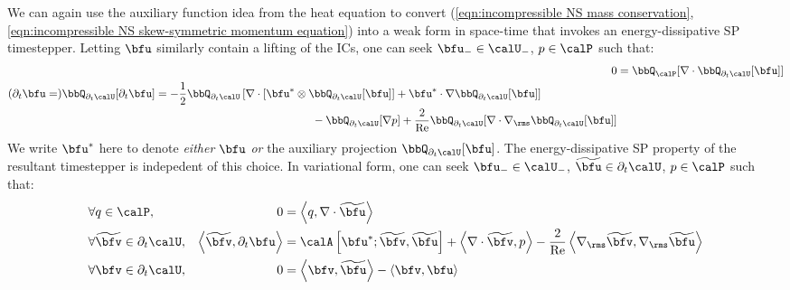     \begin{remark}
    \end{remark}

    We can again use the auxiliary function idea from the heat equation to convert (\ref{eqn:incompressible NS mass conservation}, \ref{eqn:incompressible NS skew-symmetric momentum equation}) into a weak form in space-time that invokes an energy-dissipative SP timestepper. Letting $\bfu$ similarly contain a lifting of the ICs, one can seek $\bfu_{-} \in \calU_{-}$, $p \in \calP$ such that:
    \begin{align}
                                                                            0  &=  \bbQ_{\calP}[\nabla\cdot\bbQ_{\partial_{t}\calU}[\bfu]]  \label{eqn:incompressible NS weak form 1}  \\
        \begin{split}
            (\partial_{t}\bfu  =)  \bbQ_{\partial_{t}\calU}[\partial_{t}\bfu]  &=  - \frac{1}{2}\bbQ_{\partial_{t}\calU}\left[\nabla\cdot\left[\bfu^{*}\otimes\bbQ_{\partial_{t}\calU}[\bfu]\right] + \bfu^{*}\cdot\nabla\bbQ_{\partial_{t}\calU}[\bfu]\right]  \\
                                                                               &\qquad\qquad\qquad\qquad\qquad\qquad\qquad- \bbQ_{\partial_{t}\calU}[\nabla p] + \frac{2}{\rmRe}\bbQ_{\partial_{t}\calU}[\nabla\cdot\nabla_{\rms}\bbQ_{\partial_{t}\calU}[\bfu]]
        \end{split}  \label{eqn:incompressible NS weak form 2}
    \end{align}
    We write $\bfu^{*}$ here to denote \emph{either} $\bfu$ \emph{or} the auxiliary projection $\bbQ_{\partial_{t}\calU}[\bfu]$. The energy-dissipative SP property of the resultant timestepper is indepedent of this choice. In variational form, one can seek $\bfu_{-} \in \calU_{-}$, $\widetilde{\bfu} \in \partial_{t}\calU$, $p \in \calP$ such that:
    \begin{align}
        &\forall                 q  \in  \calP,              &                                                            0  &=  \left\langle q, \nabla\cdot\widetilde{\bfu}\right\rangle  \\
        &\forall  \widetilde{\bfv}  \in  \partial_{t}\calU,  &  \left\langle\widetilde{\bfv}, \partial_{t}\bfu\right\rangle  &=  \calA\left[\bfu^{*}; \widetilde{\bfv}, \widetilde{\bfu}\right] + \left\langle\nabla\cdot\widetilde{\bfv}, p\right\rangle - \frac{2}{\rmRe}\left\langle\nabla_{\rms}\widetilde{\bfv}, \nabla_{\rms}\widetilde{\bfu}\right\rangle  \\
        &\forall              \bfv  \in  \partial_{t}\calU,  &                                                            0  &=  \left\langle\bfv, \widetilde{\bfu}\right\rangle - \left\langle\bfv, \bfu\right\rangle
    \end{align}
